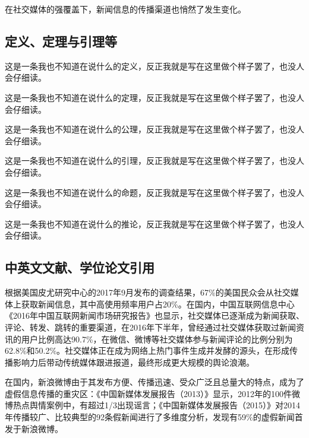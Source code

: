\documentclass[a4paper,AutoFakeBold,oneside,12pt]{book}
\begin{document}
在社交媒体的强覆盖下，新闻信息的传播渠道也悄然了发生变化。\cite{false_news_spread_2018}

\subsection{定义、定理与引理等}
\begin{definition}
这是一条我也不知道在说什么的定义，反正我就是写在这里做个样子罢了，也没人会仔细读。\cite{周兴2017基于深度学习的谣言检测及模式挖掘}
\end{definition}

\begin{theorem}
这是一条我也不知道在说什么的定理，反正我就是写在这里做个样子罢了，也没人会仔细读。
\end{theorem}

\begin{axiom}
这是一条我也不知道在说什么的公理，反正我就是写在这里做个样子罢了，也没人会仔细读。
\end{axiom}

\begin{lemma}
这是一条我也不知道在说什么的引理，反正我就是写在这里做个样子罢了，也没人会仔细读。
\end{lemma}

\begin{proposition}
这是一条我也不知道在说什么的命题，反正我就是写在这里做个样子罢了，也没人会仔细读。
\end{proposition}

\begin{corollary}
这是一条我也不知道在说什么的推论，反正我就是写在这里做个样子罢了，也没人会仔细读。
\end{corollary}

\subsection{中英文文献、学位论文引用}
根据美国皮尤研究中心的2017年9月发布的调查结果\cite{pew_news_use_2017}，67\%的美国民众会从社交媒体上获取新闻信息，其中高使用频率用户占20\%。在国内，中国互联网信息中心《2016年中国互联网新闻市场研究报告》\cite{internet_news_2016}也显示，社交媒体已逐渐成为新闻获取、评论、转发、跳转的重要渠道，在2016年下半年，曾经通过社交媒体获取过新闻资讯的用户比例高达90.7\%，在微信、微博等社交媒体参与新闻评论的比例分别为62.8\%和50.2\%。社交媒体正在成为网络上热门事件生成并发酵的源头，在形成传播影响力后带动传统媒体跟进报道，最终形成更大规模的舆论浪潮。\cite{Yang2012Automatic}

在国内，新浪微博由于其发布方便、传播迅速、受众广泛且总量大的特点，成为了虚假信息传播的重灾区：《中国新媒体发展报告（2013）》\cite{唐绪军2013中国新媒体发展报告}显示，2012年的100件微博热点舆情案例中，有超过1/3出现谣言；《中国新媒体发展报告（2015）》\cite{唐绪军2015中国新媒体发展报告}对2014年传播较广、比较典型的92条假新闻进行了多维度分析，发现有59\%的虚假新闻首发于新浪微博。
\end{document}
